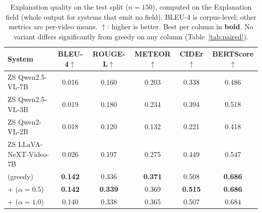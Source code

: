 \begin{table}[!t]
\centering
\caption{Explanation quality on the \dataset{} test split ($n{=}150$), computed on the Explanation field (whole output for systems that emit no field). BLEU-4 is corpus-level; other metrics are per-video means. $\uparrow$: higher is better. Best per column in \textbf{bold}. No \tcd{} variant differs significantly from greedy on any column (Table~\ref{tab:paired}).}
\label{tab:e1}
\small
\setlength{\tabcolsep}{8pt}
\begin{tabular*}{\textwidth}{@{\extracolsep{\fill}}lccccc@{}}
\toprule
\textbf{System} & \textbf{BLEU-4}$\uparrow$ & \textbf{ROUGE-L}$\uparrow$ & \textbf{METEOR}$\uparrow$ & \textbf{CIDEr}$\uparrow$ & \textbf{BERTScore}$\uparrow$ \\
\midrule
ZS Qwen2.5-VL-7B        & 0.016 & 0.160 & 0.203 & 0.338 & 0.486 \\
ZS Qwen2.5-VL-3B        & 0.019 & 0.180 & 0.234 & 0.394 & 0.518 \\
ZS Qwen2-VL-2B          & 0.018 & 0.120 & 0.132 & 0.221 & 0.418 \\
ZS LLaVA-NeXT-Video-7B  & 0.026 & 0.197 & 0.275 & 0.449 & 0.547 \\
\midrule
\crashlogic{} (greedy)                  & \textbf{0.142} & 0.336 & \textbf{0.371} & 0.508 & \textbf{0.686} \\
\crashlogic{} + \tcd{} ($\alpha{=}0.5$) & \textbf{0.142} & \textbf{0.339} & 0.369 & \textbf{0.515} & \textbf{0.686} \\
\crashlogic{} + \tcd{} ($\alpha{=}1.0$) & 0.140 & 0.338 & 0.365 & 0.507 & 0.684 \\
\bottomrule
\end{tabular*}
\end{table}

